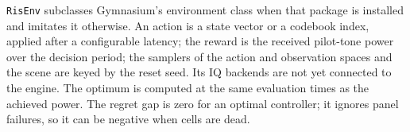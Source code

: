 \texttt{RisEnv} subclasses Gymnasium's
environment class when that package is installed and imitates it otherwise. An action is a
state vector or a codebook index, applied after a configurable latency; the reward is the
received pilot-tone power over the decision period; the samplers of the action and
observation spaces and the scene are keyed by the reset seed. Its IQ backends are not yet
connected to the engine. The optimum is computed at the same evaluation times as the achieved power.
The regret gap is zero for an optimal controller; it
ignores panel failures, so it can be negative when cells are dead.
